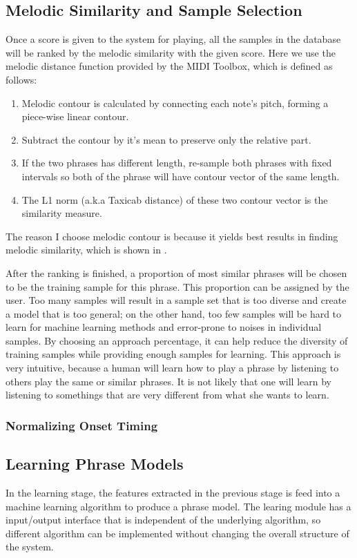    \subsection{Melodic Similarity and Sample Selection}
   Once a score is given to the system for playing, all the samples in the database will be ranked by the melodic similarity with the given score. Here we use the melodic distance function provided by the MIDI Toolbox\cite{Eerola2004}, which is defined as follows: 
   \begin{enumerate}
      \item Melodic contour is calculated by connecting each note's pitch, forming a piece-wise linear contour.
      \item Subtract the contour by it's mean to preserve only the relative part.
      \item If the two phrases has different length, re-sample both phrases with fixed intervals so both of the phrase will have contour vector of the same length.
      \item The L1 norm (a.k.a Taxicab distance) of these two contour vector is the similarity measure. 
   \end{enumerate}
   The reason I choose melodic contour is because it yields best results in finding melodic similarity, which is shown in \cite{Hoffmann-engl2005}.

   After the ranking is finished, a proportion of most similar phrases will be chosen to be the training sample for this phrase. This proportion can be assigned by the user. Too many samples will result in a sample set that is too diverse and create a model that is too general; on the other hand, too few samples will be hard to learn for machine learning methods and error-prone to noises in individual samples. By choosing an approach percentage, it can help reduce the diversity of training samples while providing enough samples for learning. This approach is very intuitive, because a human will learn how to play a phrase by listening to others play the same or similar phrases. It is not likely that one will learn by listening to somethings that are very different from what she wants to learn.
      \subsubsection{Normalizing Onset Timing}
   \subsection{Learning Phrase Models}
   In the learning stage, the features extracted in the previous stage is feed into a machine learning algorithm to produce a phrase model. The learing module has a input/output interface that is independent of the underlying algorithm, so different algorithm can be implemented without changing the overall structure of the system.

